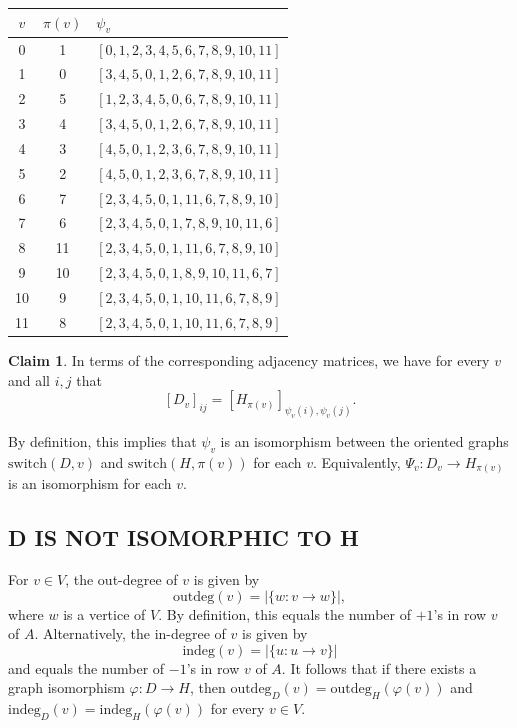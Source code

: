 \documentclass[11pt]{article}
\theoremstyle{definition}
\newtheorem{claim}[thm]{Claim}
\numberwithin{equation}{section}
\begin{document}
\begin{humanaiblock}
\begin{center}
\begin{tabular}{ccl}
$v$ & $\pi(v)$ & $\psi_v$ \\ \hline
0 & 1 & $[0,1,2,3,4,5,6,7,8,9,10,11]$\\
1 & 0 & $[3,4,5,0,1,2,6,7,8,9,10,11]$\\
2 & 5 & $[1,2,3,4,5,0,6,7,8,9,10,11]$\\
3 & 4 & $[3,4,5,0,1,2,6,7,8,9,10,11]$\\
4 & 3 & $[4,5,0,1,2,3,6,7,8,9,10,11]$\\
5 & 2 & $[4,5,0,1,2,3,6,7,8,9,10,11]$\\
6 & 7 & $[2,3,4,5,0,1,11,6,7,8,9,10]$\\
7 & 6 & $[2,3,4,5,0,1,7,8,9,10,11,6]$\\
8 &11 & $[2,3,4,5,0,1,11,6,7,8,9,10]$\\
9 &10 & $[2,3,4,5,0,1,8,9,10,11,6,7]$\\
10& 9 & $[2,3,4,5,0,1,10,11,6,7,8,9]$\\
11& 8 & $[2,3,4,5,0,1,10,11,6,7,8,9]$\\
\end{tabular}
\end{center}

\begin{claim}

In terms of the corresponding adjacency matrices, we have for every $v$ and all $i,j$ that
\[
[D_v]_{ij} = [H_{\pi(v)}]_{\psi_v(i),\psi_v(j)}.
\]

By definition, this implies that $\psi_v$ is an isomorphism between the oriented graphs
$\mathrm{switch}(D,v)$ and $\mathrm{switch}(H,\pi(v))$ for each $v$. Equivalently, $\Psi_v: D_v \to H_{\pi(v)}$ is an isomorphism for each $v$.
\end{claim}


\subsection*{D IS NOT ISOMORPHIC TO H}
For $v\in V$, the out-degree of $v$ is given by
\[
\text{outdeg}(v)=|\{w: v\to w\} |,
\]
where $w$ is a vertice of $V$. By definition, this equals the number of $+1$'s in row $v$ of $A$. Alternatively, the in-degree of $v$ is given by 
\[\text{indeg}(v)=|\{u: u\to v\}|\]
and equals the number of $-1$'s in row $v$ of $A$. It follows that if there exists a graph isomorphism $\varphi: D \to H$, then $\text{outdeg}_D(v) = \text{outdeg}_H(\varphi(v))$ and $\text{indeg}_D(v) = \text{indeg}_H(\varphi(v))$ for every $v \in V$. 


\end{humanaiblock}
\end{document}
